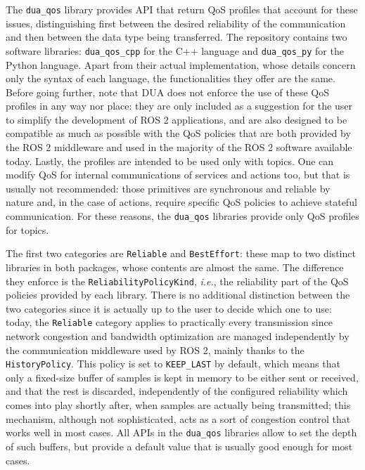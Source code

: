 The \texttt{dua\_qos} library \cite{masocco_dua_qos_nodate} provides API that return QoS profiles that account for these issues, distinguishing first between the desired reliability of the communication and then between the data type being transferred. The repository contains two software libraries: \texttt{dua\_qos\_cpp} for the C++ language and \texttt{dua\_qos\_py} for the Python language. Apart from their actual implementation, whose details concern only the syntax of each language, the functionalities they offer are the same. Before going further, note that DUA does not enforce the use of these QoS profiles in any way nor place: they are only included as a suggestion for the user to simplify the development of ROS 2 applications, and are also designed to be compatible as much as possible with the QoS policies that are both provided by the ROS 2 middleware and used in the majority of the ROS 2 software available today. Lastly, the profiles are intended to be used only with topics. One can modify QoS for internal communications of services and actions too, but that is usually not recommended: those primitives are synchronous and reliable by nature and, in the case of actions, require specific QoS policies to achieve stateful communication. For these reasons, the \texttt{dua\_qos} libraries provide only QoS profiles for topics.

The first two categories are \texttt{Reliable} and \texttt{BestEffort}: these map to two distinct libraries in both packages, whose contents are almost the same. The difference they enforce is the \texttt{ReliabilityPolicyKind}, \emph{i.e.}, the reliability part of the QoS policies provided by each library. There is no additional distinction between the two categories since it is actually up to the user to decide which one to use: today, the \texttt{Reliable} category applies to practically every transmission since network congestion and bandwidth optimization are managed independently by the communication middleware used by ROS 2, mainly thanks to the \texttt{HistoryPolicy}. This policy is set to \texttt{KEEP\_LAST} by default, which means that only a fixed-size buffer of samples is kept in memory to be either sent or received, and that the rest is discarded, independently of the configured reliability which comes into play shortly after, when samples are actually being transmitted; this mechanism, although not sophisticated, acts as a sort of congestion control that works well in most cases. All APIs in the \texttt{dua\_qos} libraries allow to set the depth of such buffers, but provide a default value that is usually good enough for most cases.

